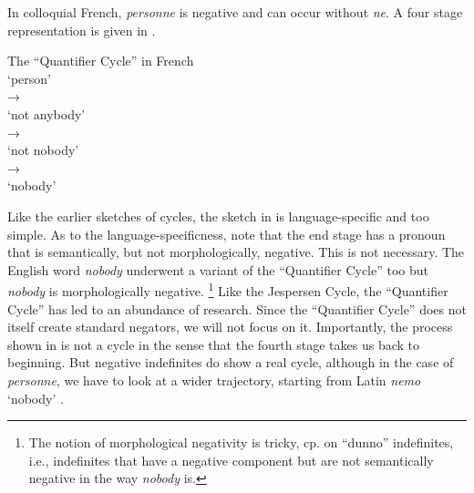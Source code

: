 ﻿\documentclass[output=paper,draft,draftmode,colorlinks,citecolor=brown]{langscibook}
\begin{document}
%
In colloquial
French, \textit{personne} is negative and can occur without \textit{ne}. A
four stage representation is given in .
%
\begin{exe}\ex\label{ex:int-qc-french}
          The ``Quantifier Cycle'' in French\\[1ex]
       `person'\\
    →\\
      `not anybody'\\
    →\\ 
       `not nobody'\\
    →\\ 
                   `nobody'
\end{exe}
%
Like the earlier sketches of cycles, the sketch in  is
language-specific and too simple. As to the language-specificness, note
that the end stage has a pronoun that is semantically, but not
morphologically, negative. This is not necessary. The English word
\textit{nobody} underwent a variant of the ``Quantifier Cycle'' too but
\textit{nobody} is morphologically negative.%
%
\footnote{The notion of
morphological negativity is tricky, cp. \textcite[130--133]{Haspelmath1997} on
``dunno'' indefinites, i.e., indefinites that have a negative component but are
not semantically negative in the way \textit{nobody} is.} %
%
Like the
Jespersen Cycle, the ``Quantifier Cycle'' has led to an abundance of
research. Since the ``Quantifier Cycle'' does not itself create standard
negators, we will not focus on it.  Importantly, the process shown in
  is not a cycle in the sense that the fourth stage takes us
back to beginning. But negative indefinites do show a real cycle, although
in the case of \textit{personne}, we have to look at a wider trajectory,
starting from Latin \textit{nemo} `nobody'
\parencite[cp.][208]{Gianollo2018a}.
%
\end{document}

